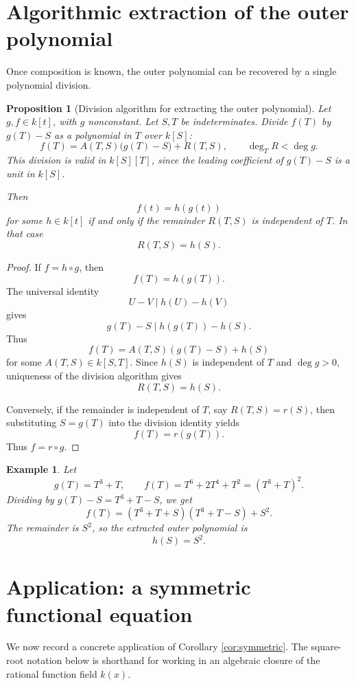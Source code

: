 \documentclass[12pt]{article}
\newtheorem{proposition}[theorem]{Proposition}
\newtheorem{example}[theorem]{Example}
\begin{document}
\section{Algorithmic extraction of the outer polynomial}

Once composition is known, the outer polynomial can be recovered by a single polynomial division.

\begin{proposition}[Division algorithm for extracting the outer polynomial]\label{prop:algorithm}
Let \(g,f\in k[t]\), with \(g\) nonconstant.  Let \(S,T\) be indeterminates.  Divide \(f(T)\) by \(g(T)-S\) as a polynomial in \(T\) over \(k[S]\):
\[
    f(T)=A(T,S)\bigl(g(T)-S\bigr)+R(T,S),
    \qquad
    \deg_T R<\deg g.
\]
This division is valid in \(k[S][T]\), since the leading coefficient of \(g(T)-S\) is a unit in \(k[S]\).

Then
\[
    f(t)=h(g(t))
\]
for some \(h\in k[t]\) if and only if the remainder \(R(T,S)\) is independent of \(T\).  In that case
\[
    R(T,S)=h(S).
\]
\end{proposition}

\begin{proof}
If \(f=h\circ g\), then
\[
    f(T)=h(g(T)).
\]
The universal identity
\[
    U-V\mid h(U)-h(V)
\]
gives
\[
    g(T)-S\mid h(g(T))-h(S).
\]
Thus
\[
    f(T)=A(T,S)(g(T)-S)+h(S)
\]
for some \(A(T,S)\in k[S,T]\).  Since \(h(S)\) is independent of \(T\) and \(\deg g>0\), uniqueness of the division algorithm gives
\[
    R(T,S)=h(S).
\]

Conversely, if the remainder is independent of \(T\), say \(R(T,S)=r(S)\), then substituting \(S=g(T)\) into the division identity yields
\[
    f(T)=r(g(T)).
\]
Thus \(f=r\circ g\).
\end{proof}

\begin{example}
Let
\[
    g(T)=T^3+T,
    \qquad
    f(T)=T^6+2T^4+T^2=(T^3+T)^2.
\]
Dividing by \(g(T)-S=T^3+T-S\), we get
\[
    f(T)=(T^3+T+S)(T^3+T-S)+S^2.
\]
The remainder is \(S^2\), so the extracted outer polynomial is
\[
    h(S)=S^2.
\]
\end{example}

\section{Application: a symmetric functional equation}

We now record a concrete application of Corollary \ref{cor:symmetric}.  The square-root notation below is shorthand for working in an algebraic closure of the rational function field \(k(x)\).
\end{document}
